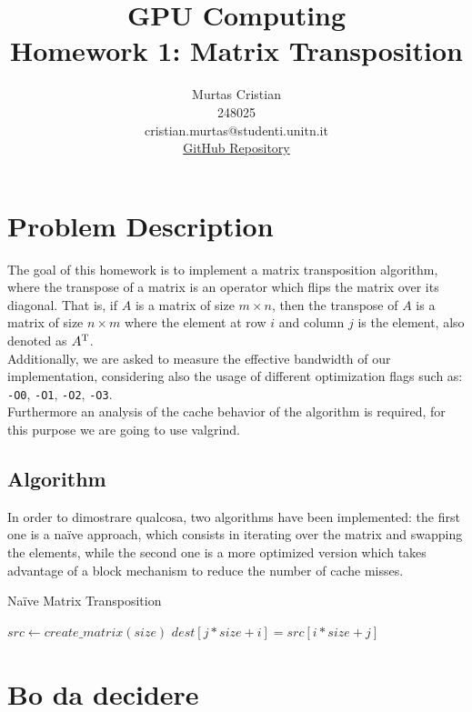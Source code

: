\documentclass{article}
\title{\textbf{GPU Computing} \\
    \large Homework 1: Matrix Transposition \\
}
\author{Murtas Cristian \\ 248025 \\ cristian.murtas@studenti.unitn.it \\
\href{https://github.com/SecondarySkyler/gpu-computing/tree/main/matrix_transposition}{GitHub Repository}
}
\begin{document}
\maketitle

\section{Problem Description}
The goal of this homework is to implement a matrix transposition algorithm, where the transpose of a matrix
is an operator which flips the matrix over its diagonal. That is, if $A$ is a matrix of size $m \times n$, then
the transpose of $A$ is a matrix of size $n \times m$ where the element at row $i$ and column $j$ is the element,
also denoted as $A\textsuperscript{T}$. \\
Additionally, we are asked to measure the effective bandwidth of our implementation, considering also the
usage of different optimization flags such as: \texttt{-O0}, \texttt{-O1}, \texttt{-O2}, \texttt{-O3}. \\
Furthermore an analysis of the cache behavior of the algorithm is required, for this purpose we are going to use
valgrind.
\subsection{Algorithm}
In order to dimostrare qualcosa, two algorithms have been implemented: the first one is a na\"{i}ve approach, which
consists in iterating over the matrix and swapping the elements, while the second one is a more optimized version
which takes advantage of a block mechanism to reduce the number of cache misses.
\begin{algorithm}
    \caption{Na\"{i}ve Matrix Transposition}
    \begin{algorithmic}[1]
        \State $src \gets create\_matrix(size)$
                \State $dest[j * size + i] = src[i * size + j]$
            \EndFor
        \EndFor
    \end{algorithmic}
\end{algorithm}

\section{Bo da decidere}
\end{document}
